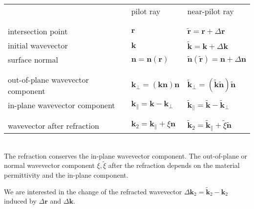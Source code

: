 \documentclass[12pt,a4paper,twoside,openright,BCOR10mm,headsepline,titlepage,abstracton,chapterprefix,final]{scrreprt}
\newcommand\Vector[1]{{\mathbf{#1}}}
\newcommand\wavenumber{k}
\newcommand\Wavevector{\Vector{\wavenumber}}
\begin{document}
\begin{tabular}{ l | l | l }
		    & pilot ray & near-pilot ray \\
& & \\ \hline & & \\
intersection point  & $\Vector{r}$ & $\tilde{\Vector{r}} = \Vector{r} + \Delta\Vector{r}$ \\
initial wavevector  & $\Wavevector$ & $\tilde{\Wavevector} = \Wavevector + \Delta\Wavevector$ \\
surface normal      & $\Vector{n} = \Vector{n}(\Vector{r})$ & $\tilde{\Vector{n}}(\tilde{\Vector{r}}) = \Vector{n} + \Delta\Vector{n}$ \\
& & \\ \hline & & \\
out-of-plane wavevector component &  $\Wavevector_{\perp} = (\Wavevector \Vector{n})\Vector{n}$ & $\tilde{\Wavevector}_{\perp} = (\tilde{\Wavevector} \tilde{\Vector{n}})\tilde{\Vector{n}}$ \\
in-plane wavevector component     &  $\Wavevector_{\parallel} = \Wavevector - \Wavevector_{\perp}$ & $\tilde{\Wavevector}_{\parallel} = \tilde{\Wavevector} - \tilde{\Wavevector}_{\perp}$ \\
& & \\ \hline & & \\
wavevector after refraction       &  $\Wavevector_2 = \Wavevector_{\parallel} + \xi \Vector{n}$ & $\tilde{\Wavevector}_2 = \tilde{\Wavevector}_{\parallel} + \tilde{\xi} \tilde{\Vector{n}}$
\end{tabular}
\\[2ex]
The refraction conserves the in-plane wavevector component. 
The out-of-plane or normal wavevector component $\xi, \tilde{\xi}$ after the refraction depends on the material permittivity and the in-plane component.

We are interested in the change of the refracted wavevector $\Delta\Wavevector_2 = \tilde{\Wavevector}_2 - \Wavevector_2$ induced by $\Delta\Vector{r}$ and $\Delta\Wavevector$.
\end{document}
